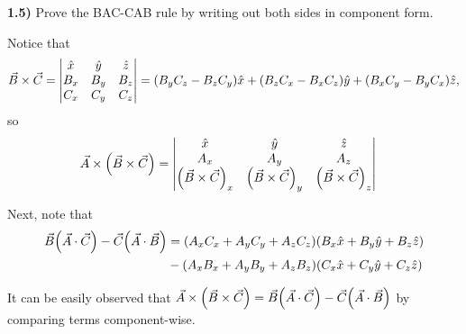 \documentclass[12pt,a4paper]{article}
\newcommand{\xhat}{\hat{x}}
\newcommand{\yhat}{\hat{y}}
\newcommand{\zhat}{\hat{z}}
\newcommand{\prob}[2]{\textbf{#1)} #2}
\begin{document}
\prob{1.5}{Prove the BAC-CAB rule by writing out both sides in component form.} 

Notice that 
\begin{align*}
\vec{B} \times \vec{C} = 
\begin{vmatrix}
\xhat & \yhat & \zhat \\
B_x & B_y & B_z \\
C_x & C_y & C_z 
\end{vmatrix}
=
\qty(B_yC_z - B_zC_y)\xhat + \qty(B_zC_x - B_xC_z)\yhat + \qty(B_xC_y - B_yC_x)\zhat,
\end{align*}
so 
\begin{align*}
\vec{A} \times \qty(\vec{B} \times \vec{C}) &= 
\begin{vmatrix}
\xhat & \yhat & \zhat \\
A_x & A_y & A_z \\
\qty(\vec{B} \times \vec{C})_x & \qty(\vec{B} \times \vec{C})_y & \qty(\vec{B} \times \vec{C})_z 
\end{vmatrix} 
\end{align*}

Next, note that
\begin{align*}
\vec{B}\qty(\vec{A} \cdot \vec{C}) - \vec{C}\qty(\vec{A} \cdot \vec{B}) &= \qty(A_xC_x + A_yC_y + A_zC_z)\qty(B_x\xhat + B_y\yhat + B_z\zhat) \\
&- \qty(A_xB_x + A_yB_y + A_zB_z)\qty(C_x\xhat + C_y\yhat + C_z\zhat)
\end{align*}
It can be easily observed that $\vec{A} \times \qty(\vec{B} \times \vec{C}) = \vec{B}\qty(\vec{A} \cdot \vec{C}) - \vec{C}\qty(\vec{A} \cdot \vec{B})$ by comparing terms component-wise.
\end{document}
